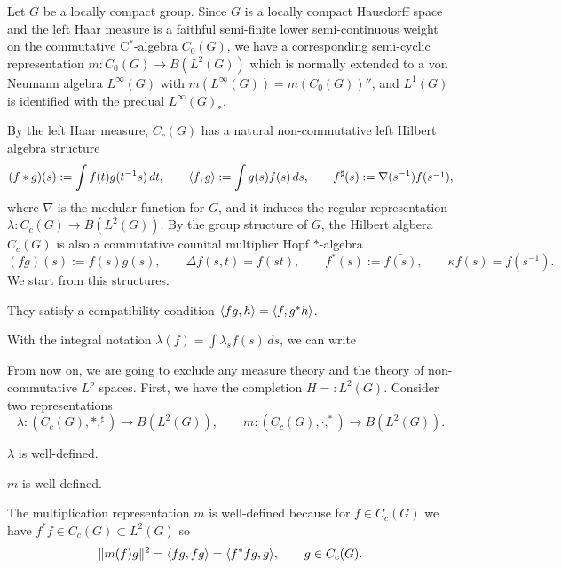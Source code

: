 \documentclass{../../large}
\begin{document}
\begin{prb}
Let $G$ be a locally compact group.
Since $G$ is a locally compact Hausdorff space and the left Haar measure is a faithful semi-finite lower semi-continuous weight on the commutative C$^*$-algebra $C_0(G)$, we have a corresponding semi-cyclic representation $m:C_0(G)\to B(L^2(G))$ which is normally extended to a von Neumann algebra $L^\infty(G)$ with $m(L^\infty(G))=m(C_0(G))''$, and $L^1(G)$ is identified with the predual $L^\infty(G)_*$.

By the left Haar measure, $C_c(G)$ has a natural non-commutative left Hilbert algebra structure
\[(f*g)(s):=\int f(t)g(t^{-1}s)\,dt,\qquad\langle f,g\rangle:=\int\overline{g(s)}f(s)\,ds,\qquad f^\sharp(s):=\nabla(s^{-1})\overline{f(s^{-1})},\]
where $\nabla$ is the modular function for $G$, and it induces the regular representation $\lambda:C_c(G)\to B(L^2(G))$.
By the group structure of $G$, the Hilbert algbera $C_c(G)$ is also a commutative counital multiplier Hopf $*$-algebra 
\[(fg)(s):=f(s)g(s),\qquad\Delta f(s,t)=f(st),\qquad f^*(s):=\bar{f(s)},\qquad\kappa f(s)=f(s^{-1}).\]
We start from this structures.


They satisfy a compatibility condition $\langle fg,h\rangle=\langle f,g^*h\rangle$.

With the integral notation $\lambda(f)=\int\lambda_sf(s)\,ds$, we can write

From now on, we are going to exclude any measure theory and the theory of non-commutative $L^p$ spaces.
First, we have the completion $H=:L^2(G)$.
Consider two representations
\[\lambda:(C_c(G),*,^\sharp)\to B(L^2(G)),\qquad m:(C_c(G),\cdot,^*)\to B(L^2(G)).\]
\begin{parts}
\item $\lambda$ is well-defined.
\item $m$ is well-defined.
\end{parts}
\end{prb}
\begin{pf}
The multiplication representation $m$ is well-defined because for $f\in C_c(G)$ we have $f^*f\in C_c(G)\subset L^2(G)$ so
\[\|m(f)g\|^2=\langle fg,fg\rangle=\langle f^*fg,g\rangle,\qquad g\in C_c(G).\]
\end{pf}








\section{}
\end{document}
